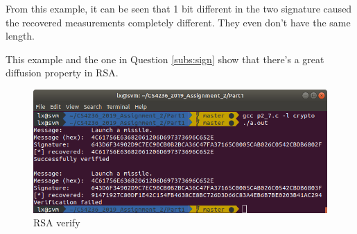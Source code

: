 From this example, it can be seen that 1 bit different in the two signature caused the recovered measurements completely different. They even don't have the same length.

This example and the one in Question \ref{subs:sign} show that there's a great diffusion property in RSA.

\begin{figure}[ht]
\centering
\includegraphics[width=\columnwidth]{pictures/p2_7.png}
\caption{
    RSA verify
}
\label{fig:p2_7}
\end{figure}